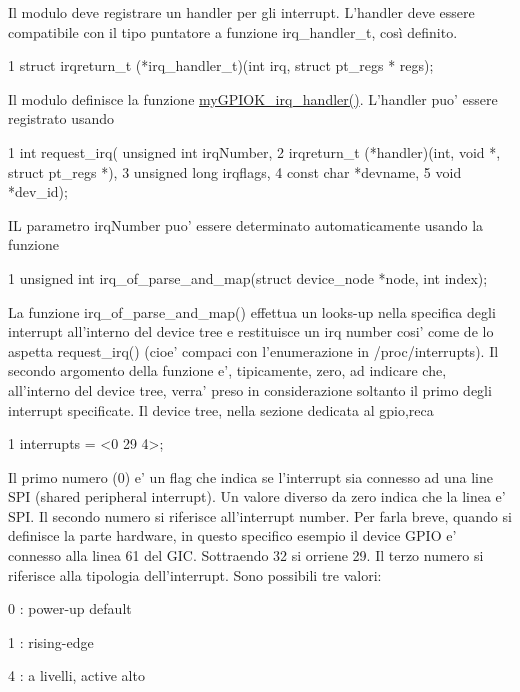 Il modulo deve registrare un handler per gli interrupt. L'handler deve essere compatibile con il tipo puntatore a funzione irq\+\_\+handler\+\_\+t, così definito. 
\begin{DoxyCode}
1 struct irqreturn\_t (*irq\_handler\_t)(int irq, struct pt\_regs * regs);
\end{DoxyCode}
 Il modulo definisce la funzione \hyperlink{group___linux-_driver_ga2fc230a12a97aa63e43b2dc4aec73511}{my\+G\+P\+I\+O\+K\+\_\+irq\+\_\+handler()}. L'handler puo' essere registrato usando 
\begin{DoxyCode}
1 int request\_irq(    unsigned int irqNumber,
2                     irqreturn\_t (*handler)(int, void *, struct pt\_regs *),
3                     unsigned long irqflags,
4                     const char *devname,
5                     void *dev\_id);
\end{DoxyCode}
 I\+L parametro irq\+Number puo' essere determinato automaticamente usando la funzione 
\begin{DoxyCode}
1 unsigned int irq\_of\_parse\_and\_map(struct device\_node *node, int index);
\end{DoxyCode}
 La funzione irq\+\_\+of\+\_\+parse\+\_\+and\+\_\+map() effettua un looks-\/up nella specifica degli interrupt all'interno del device tree e restituisce un irq number cosi' come de lo aspetta request\+\_\+irq() (cioe' compaci con l'enumerazione in /proc/interrupts). Il secondo argomento della funzione e', tipicamente, zero, ad indicare che, all'interno del device tree, verra' preso in considerazione soltanto il primo degli interrupt specificate. Il device tree, nella sezione dedicata al gpio,reca 
\begin{DoxyCode}
1 interrupts = <0 29 4>;
\end{DoxyCode}
 Il primo numero (0) e' un flag che indica se l'interrupt sia connesso ad una line S\+P\+I (shared peripheral interrupt). Un valore diverso da zero indica che la linea e' S\+P\+I. Il secondo numero si riferisce all'interrupt number. Per farla breve, quando si definisce la parte hardware, in questo specifico esempio il device G\+P\+I\+O e' connesso alla linea 61 del G\+I\+C. Sottraendo 32 si orriene 29. Il terzo numero si riferisce alla tipologia dell'interrupt. Sono possibili tre valori\+:
\begin{DoxyItemize}
\item 0 \+: power-\/up default
\item 1 \+: rising-\/edge
\item 4 \+: a livelli, active alto
\end{DoxyItemize}

